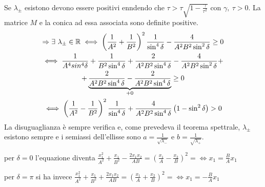 \documentclass[Main.tex]{subfiles}
\begin{document}
\begin{tema}
\begin{gather}
\end{gather}
Se $\lambda_\pm$ esistono devono essere positivi enndendo che $\tau > \tau \sqrt{ 1 - \frac{\gamma}{\tau^2}}$ con $\gamma, \ \tau  >0$. La matrice $M$ e la conica ad essa associata sono definite positive.
\begin{gather}
\notag \Rightarrow \exists \  \lambda_\pm \in \mathbb{R} \iff \left( \frac{1}{A^2} + \frac{1}{B^2} \right)^2 \frac{1}{\sin^4 \delta} - \frac{4}{A^2 B^2 \sin ^2 \delta}  \geq 0	\\ \notag
\iff  \frac{1}{A^4 sin^4 \delta} + \frac{1}{B^2 \sin^4 \delta} + \frac{2}{A^2B^2 \sin ^4 \delta } - \frac{4}{A^2 B^2 \sin^2 \delta} + \\  \notag + \underbrace{\frac{2}{A^2B^2 \sin^4 \delta}- \frac{2}{A^2B^2 \sin^4 \delta}}_{+0} \geq 0\\
\iff \left( \frac{1}{A^2} - \frac{1}{B^2} \right)^2 \frac{1}{\sin^4 \delta} + \frac{4}{A^2 B^2 \sin ^4 \delta } \left( 1- \sin^2 \delta \right) >0 \notag
\end{gather}
La disuguaglianza è sempre verifica e, come prevedeva il teorema spettrale, $\lambda_\pm$ esistono sempre e i semiassi dell'ellisse sono $a= \frac{1}{\sqrt{\lambda_-}}$ e $b=\frac{1}{\sqrt{\lambda_+}}$.
\begin{osservazioni}
	\item per $\delta=0$ l'equazione diventa $\frac{x_1^2}{A^2} + \frac{x_1}{B^2} \boxed{-} \frac{2x_1x_2}{AB} = \left( \frac{x_1}{A} \boxed{-} \frac{x_2}{B} \right)^2= \iff x_1 = \frac{B}{A}x_1$
	\item per $\delta = \pi$ si ha invece $\frac{x_1^2}{A^2} + \frac{x_1}{B^2} \boxed{+} \frac{2x_1x_2}{AB} = \left( \frac{x_1}{A} \boxed{+} \frac{x_2}{B} \right)^2= \iff x_1 = -\frac{B}{A}x_1$
\end{osservazioni}
\end{tema}
\end{document}

